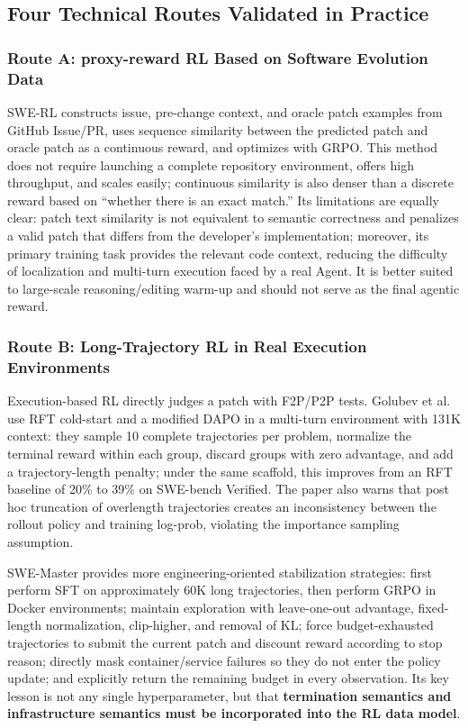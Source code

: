 \documentclass[10pt,a4paper,UTF8,fontset=none]{ctexart}
\begin{document}
\subsection{Four Technical Routes Validated in Practice}

\subsubsection{Route A: proxy-reward RL Based on Software Evolution Data}

SWE-RL constructs issue, pre-change context, and oracle patch examples from GitHub Issue/PR, uses sequence similarity between the predicted patch and oracle patch as a continuous reward, and optimizes with GRPO\cite{wei2025swerl}. This method does not require launching a complete repository environment, offers high throughput, and scales easily; continuous similarity is also denser than a discrete reward based on ``whether there is an exact match.'' Its limitations are equally clear: patch text similarity is not equivalent to semantic correctness and penalizes a valid patch that differs from the developer's implementation; moreover, its primary training task provides the relevant code context, reducing the difficulty of localization and multi-turn execution faced by a real Agent. It is better suited to large-scale reasoning/editing warm-up and should not serve as the final agentic reward.

\subsubsection{Route B: Long-Trajectory RL in Real Execution Environments}

Execution-based RL directly judges a patch with F2P/P2P tests. Golubev et al. use RFT cold-start and a modified DAPO in a multi-turn environment with 131K context: they sample 10 complete trajectories per problem, normalize the terminal reward within each group, discard groups with zero advantage, and add a trajectory-length penalty; under the same scaffold, this improves from an RFT baseline of 20\% to 39\% on SWE-bench Verified\cite{golubev2025longcontextrl}. The paper also warns that post hoc truncation of overlength trajectories creates an inconsistency between the rollout policy and training log-prob, violating the importance sampling assumption.

SWE-Master provides more engineering-oriented stabilization strategies\cite{song2026swemaster}: first perform SFT on approximately 60K long trajectories, then perform GRPO in Docker environments; maintain exploration with leave-one-out advantage, fixed-length normalization, clip-higher, and removal of KL; force budget-exhausted trajectories to submit the current patch and discount reward according to stop reason; directly mask container/service failures so they do not enter the policy update; and explicitly return the remaining budget in every observation. Its key lesson is not any single hyperparameter, but that \textbf{termination semantics and infrastructure semantics must be incorporated into the RL data model}.
\end{document}

